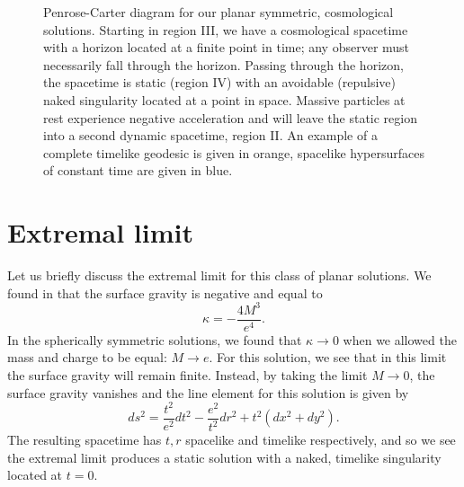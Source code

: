 \begin{figure}[h!]
\caption[Penrose-Carter diagram for our planar symmetric, cosmological solutions]{Penrose-Carter diagram for our planar symmetric, cosmological solutions. Starting in region III, we have a cosmological spacetime with a horizon located at a finite point in time; any observer must necessarily fall through the horizon. Passing through the horizon, the spacetime is static (region IV) with an avoidable (repulsive) naked singularity located at a point in space. Massive particles at rest experience negative acceleration and will leave the static region into a second dynamic spacetime, region II. An example of a complete timelike geodesic is given in orange, spacelike hypersurfaces of constant time are given in blue.}
\label{fig:PC}
\end{figure}



\section{Extremal limit}
\label{sec:pemextremal}
Let us briefly discuss the extremal limit for this class of planar solutions. We found in  that the surface gravity is negative and equal to
\begin{equation*}
	\kappa = - \frac{4M^3}{e^4}.
\end{equation*}
In the spherically symmetric solutions, we found that $\kappa \to 0$ when we allowed the mass and charge to be equal: $M \to e$. For this solution, we see that in this limit the surface gravity will remain finite. Instead, by taking the limit $M \rightarrow 0$, the surface gravity vanishes and the line element for this solution is given by
\begin{equation*}
	ds^2 = \frac{t^2}{e^2} dt^2 - \frac{e^2}{t^2} dr^2 +  t^2 \left( dx^2 + dy^2 \right).
\end{equation*}
The resulting spacetime has $t,r$ spacelike and timelike respectively, and so we see the extremal limit produces a static solution with a naked, timelike singularity located at $t = 0$. 

